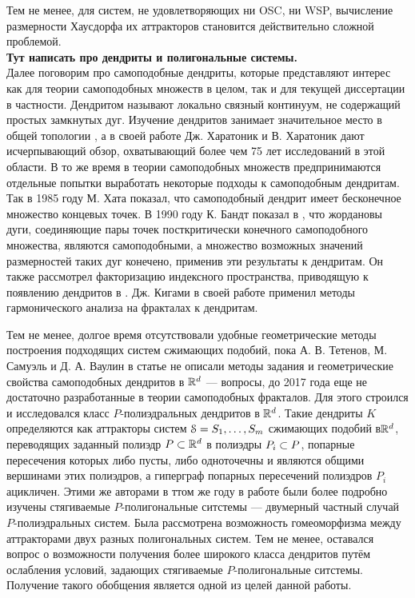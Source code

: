 Тем не менее, для систем, не удовлетворяющих ни OSC, ни WSP, вычисление размерности Хаусдорфа их аттракторов становится действительно сложной проблемой.\\

{\bf Тут написать про дендриты и полигональные системы.}\\
Далее поговорим про самоподобные дендриты, которые представляют интерес как для теории самоподобных множеств в целом, так и для текущей диссертации в частности.
Дендритом называют локально связный континуум, не содержащий простых замкнутых дуг.
Изучение дендритов занимает значительное место в общей топологии \cite{Kur1, whyburn1948antop}, а в своей работе \cite{Char} Дж. Харатоник и В. Харатоник дают исчерпывающий обзор, охватывающий более чем 75 лет исследований в этой области.
В то же время в теории самоподобных множеств предпринимаются отдельные попытки выработать некоторые подходы к самоподобным дендритам.
Так в 1985 году М. Хата \cite{Hata1985}  показал, что самоподобный дендрит имеет бесконечное множество концевых точек.
В 1990 году К. Бандт показал в \cite{SSS6}, что жордановы дуги, соединяющие пары точек посткритически конечного самоподобного множества, являются самоподобными, а множество возможных значений размерностей таких дуг конечено, применив эти результаты к дендритам.
Он также рассмотрел факторизацию индексного пространства, приводящую к появлению дендритов в \cite{SSS2}.
Дж. Кигами в своей работе \cite{Kig95} применил методы гармонического анализа на фракталах к дендритам. 

Тем не менее, долгое время отсутствовали удобные геометрические методы построения подходящих систем сжимающих подобий, пока А. В. Тетенов, М. Самуэль и Д. А. Ваулин в статье \cite{TSV2017} не описали методы задания и геометрические свойства самоподобных дендритов в $\mathbb{R}^d$ --- вопросы, до 2017 года еще не достаточно разработанные в теории самоподобных фракталов. 
Для этого строился и исследовался класс $P$-полиэдральных дендритов в $\mathbb{R}^d$. 
Такие дендриты $K$ определяются как аттракторы систем ${\EuScript S} = {S_1,\ldots, S_m}$ сжимающих подобий в$\mathbb{R}^d$, переводящих заданный полиэдр $P \subset \mathbb{R}^d$ в полиэдры $P_i \subset P$, попарные пересечения которых либо пусты, либо одноточечны и являются общими вершинами этих полиэдров, а гиперграф попарных пересечений полиэдров $P_i$ ацикличен.
Этими же авторами в ттом же году в работе \cite{STV2017} были более подробно изучены стягиваемые $P$-полигональные ситстемы --- двумерный частный случай $P$-полиэдральных систем.
Была рассмотрена возможность гомеоморфизма между аттракторами двух разных полигональных систем.
Тем не менее, оставался вопрос о возможности получения более широкого класса дендритов путём ослабления условий, задающих стягиваемые $P$-полигональные ситстемы. 
Получение такого обобщения является одной из целей данной работы.

